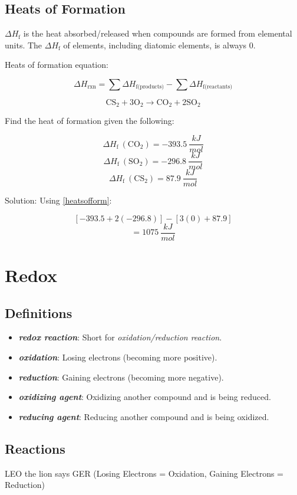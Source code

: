 \documentclass[a4paper, 12pt]{article}
\newcommand{\Hf}{$\Delta H_\text{f}$} %
\newcommand{\mathHf}{\Delta H_\text{f}} %
\begin{document}
\subsection{Heats of Formation}
\Hf{} is the heat absorbed/released when compounds are formed from elemental units. The \Hf{} of elements, including diatomic elements, is always 0.

Heats of formation equation:

\begin{equation} \label{heatsofform}
\Delta H_\text{rxn} = \sum \Delta H_\text{f(products)} -  \sum \Delta H_\text{f(reactants)}
\end{equation}

$$\text{CS}_2 + 3\text{O}_2 \longrightarrow \text{CO}_2 + 2\text{SO}_2$$

Find the heat of formation given the following: 

$$\mathHf \: (\text{CO}_2) = -393.5 \: \frac{kJ}{mol}$$
$$\mathHf \: (\text{SO}_2) = -296.8 \: \frac{kJ}{mol}$$
$$\mathHf \: (\text{CS}_2) = 87.9 \: \frac{kJ}{mol}$$

Solution: Using \ref{heatsofform}:

$$ [-393.5 + 2(-296.8)] - [3(0) + 87.9] $$
$$ = \boxed{1075 \: \frac{kJ}{mol}} $$

\section{Redox}

\subsection{Definitions}

\begin{itemize}[leftmargin=*, nosep]
\item \textbf{\textit{redox reaction}}: Short for \textit{oxidation/reduction reaction}.
\item \textbf{\textit{oxidation}}: Losing electrons (becoming more positive). 
\item \textbf{\textit{reduction}}: Gaining electrons (becoming more negative).
\item \textbf{\textit{oxidizing agent}}: Oxidizing another compound and is being reduced.
\item \textbf{\textit{reducing agent}}: Reducing another compound and is being oxidized.
\end{itemize}

\subsection{Reactions}
LEO the lion says GER (Losing Electrons = Oxidation, Gaining Electrons = Reduction)
\end{document}
